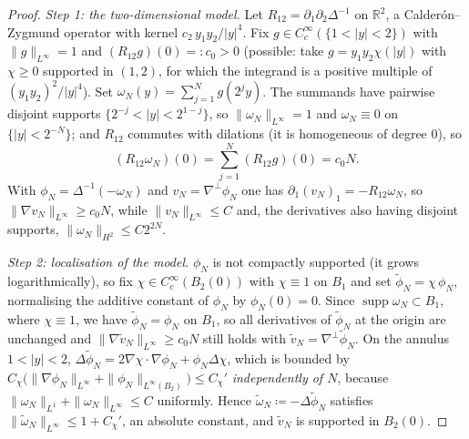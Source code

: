 \documentclass[11pt]{article}
\theoremstyle{definition}
\theoremstyle{remark}
\newcommand{\R}{\mathbb{R}}
\providecommand{\colonequals}{\coloneqq}
\begin{document}
\begin{proof}
  \emph{Step 1: the two-dimensional model.} Let
  $R_{12}=\partial_1\partial_2\Delta^{-1}$ on $\R^2$, a Calder\'on--Zygmund
  operator with kernel $c_2\,y_1y_2/|y|^4$. Fix
  $g\in C_c^\infty(\{1<|y|<2\})$ with $\|g\|_{L^\infty}=1$ and
  $(R_{12}g)(0)=:c_0>0$ (possible: take $g=y_1y_2\chi(|y|)$ with
  $\chi\geq0$ supported in $(1,2)$, for which the integrand is a positive
  multiple of $(y_1y_2)^2/|y|^4$). Set
  $\omega_N(y)=\sum_{j=1}^Ng(2^jy)$. The summands have pairwise disjoint
  supports $\{2^{-j}<|y|<2^{1-j}\}$, so $\|\omega_N\|_{L^\infty}=1$ and
  $\omega_N\equiv0$ on $\{|y|<2^{-N}\}$; and $R_{12}$ commutes with dilations
  (it is homogeneous of degree $0$), so
  \[
    (R_{12}\omega_N)(0)=\sum_{j=1}^N(R_{12}g)(0)=c_0N .
  \]
  With $\phi_N=\Delta^{-1}(-\omega_N)$ and $v_N=\nabla^\perp\phi_N$ one has
  $\partial_1(v_N)_1=-R_{12}\omega_N$, so
  $\|\nabla v_N\|_{L^\infty}\geq c_0N$, while
  $\|v_N\|_{L^\infty}\leq C$ and, the derivatives also having disjoint
  supports, $\|\omega_N\|_{H^2}\leq C2^{2N}$.

  \emph{Step 2: localisation of the model.} $\phi_N$ is not compactly
  supported (it grows logarithmically), so fix $\chi\in C_c^\infty(B_2(0))$
  with $\chi\equiv1$ on $B_1$ and set
  $\tilde\phi_N=\chi\,\phi_N$, normalising the additive constant of $\phi_N$
  by $\phi_N(0)=0$. Since $\operatorname{supp}\omega_N\subset B_1$, where
  $\chi\equiv1$, we have $\tilde\phi_N=\phi_N$ on $B_1$, so all derivatives
  of $\tilde\phi_N$ at the origin are unchanged and
  $\|\nabla\tilde v_N\|_{L^\infty}\geq c_0N$ still holds with
  $\tilde v_N=\nabla^\perp\tilde\phi_N$. On the annulus $1<|y|<2$,
  $\Delta\tilde\phi_N=2\nabla\chi\cdot\nabla\phi_N+\phi_N\Delta\chi$, which is
  bounded by $C_\chi\bigl(\|\nabla\phi_N\|_{L^\infty}
  +\|\phi_N\|_{L^\infty(B_2)}\bigr)\leq C_\chi'$ \emph{independently of $N$},
  because $\|\omega_N\|_{L^1}+\|\omega_N\|_{L^\infty}\leq C$ uniformly. Hence
  $\tilde\omega_N\colonequals-\Delta\tilde\phi_N$ satisfies
  $\|\tilde\omega_N\|_{L^\infty}\leq1+C_\chi'$, an absolute constant, and
  $\tilde v_N$ is supported in $B_2(0)$.


\end{proof}
\end{document}

